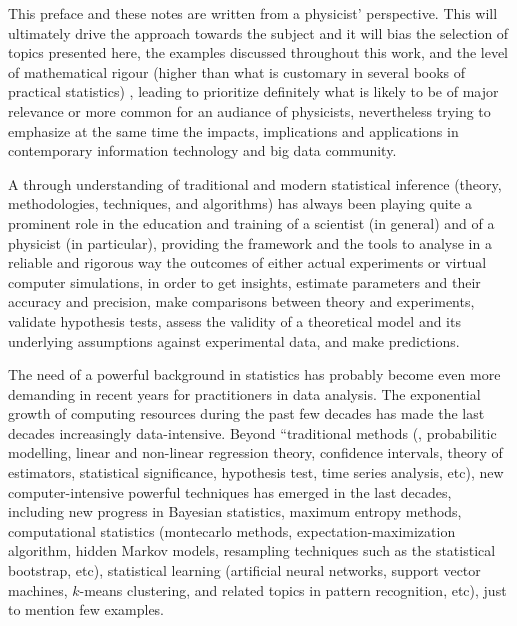 


This preface and these notes are written from a physicist' perspective. 
This will ultimately drive the approach towards the subject and it will bias the selection of topics
presented here,
the examples discussed throughout this work, and the
level of mathematical rigour (higher than what is customary in several books of practical statistics) ,
leading to prioritize definitely what is likely to be of major relevance or more common for an
audiance of physicists, nevertheless trying to emphasize at the same time the impacts, implications 
and applications 
in contemporary information technology and big data community.

A through understanding of traditional and modern 
statistical inference (theory, methodologies, techniques, and algorithms) 
has always been playing quite a prominent  
role in the education and training of a scientist (in general) and of a
physicist (in particular), providing the framework and the tools to analyse
in a reliable and rigorous way 
the outcomes of
either actual experiments 
or virtual computer simulations,
in order to get insights, estimate parameters and their accuracy and precision, make comparisons between theory and
experiments, validate 
hypothesis tests, assess the validity of a theoretical model and its underlying
assumptions against experimental data, and make predictions. 

The need of a powerful background in statistics has probably become even more
demanding in recent years for practitioners in data analysis. 
The exponential growth of computing resources during the past few decades has made
the last decades increasingly data-intensive.
Beyond ``traditional methods (\eg, probabilitic modelling, linear and non-linear  regression theory,
confidence intervals, theory of estimators,  statistical significance,
hypothesis test, time series analysis, etc), new computer-intensive powerful
techniques has emerged in the last decades, including new progress in
Bayesian statistics, maximum entropy methods, computational statistics
(montecarlo methods, expectation-maximization algorithm,
hidden Markov models, resampling techniques such as the statistical bootstrap, etc), statistical learning 
(artificial neural
networks, support vector machines, $k$-means clustering, and
related topics in pattern recognition, etc), just
to mention few examples. 



